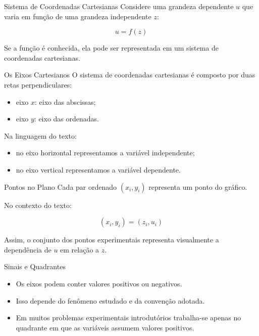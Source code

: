 \documentclass[aspectratio=169]{beamer}
\begin{document}
\begin{frame}{Sistema de Coordenadas Cartesianas}
Considere uma grandeza dependente \(u\) que varia em função de uma grandeza independente \(z\):

\begin{equation}
u = f(z)
\end{equation}

Se a função é conhecida, ela pode ser representada em um sistema de coordenadas cartesianas.
\end{frame}

\begin{frame}{Os Eixos Cartesianos}
O sistema de coordenadas cartesianas é composto por duas retas perpendiculares:

\begin{itemize}
\item eixo \(x\): eixo das abscissas;
\item eixo \(y\): eixo das ordenadas.
\end{itemize}

Na linguagem do texto:

\begin{itemize}
\item no eixo horizontal representamos a variável independente;
\item no eixo vertical representamos a variável dependente.
\end{itemize}
\end{frame}

\begin{frame}{Pontos no Plano}
Cada par ordenado \((x_i,y_i)\) representa um ponto do gráfico.

No contexto do texto:

\begin{equation}
(x_i,y_i) = (z_i,u_i)
\end{equation}

Assim, o conjunto dos pontos experimentais representa visualmente a dependência de \(u\) em relação a \(z\).
\end{frame}

\begin{frame}{Sinais e Quadrantes}
\begin{itemize}
\item Os eixos podem conter valores positivos ou negativos.
\item Isso depende do fenômeno estudado e da convenção adotada.
\item Em muitos problemas experimentais introdutórios trabalha-se apenas no quadrante em que as variáveis assumem valores positivos.
\end{itemize}
\end{frame}
\end{document}
